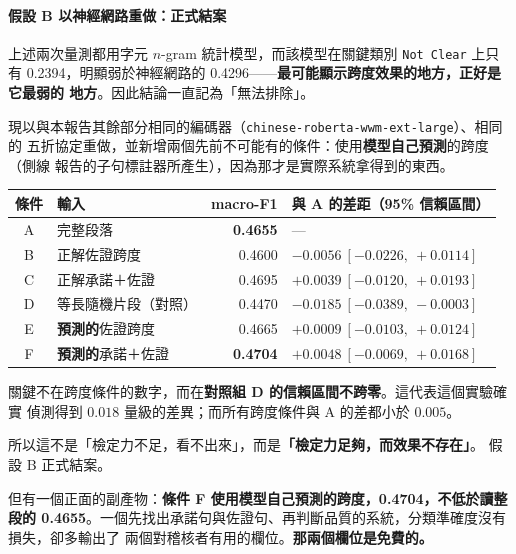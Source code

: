 \documentclass[11pt,a4paper]{ctexart}
\newcommand{\fn}[1]{\texttt{#1}}
\begin{document}
\paragraph{假設 B 以神經網路重做：正式結案}
\label{sec:bclosed}

上述兩次量測都用字元 $n$-gram 統計模型，而該模型在關鍵類別 \fn{Not Clear} 上只有
0.2394，明顯弱於神經網路的 0.4296——\textbf{最可能顯示跨度效果的地方，正好是它最弱的
地方}。因此結論一直記為「無法排除」。

現以與本報告其餘部分相同的編碼器（\texttt{chinese-roberta-wwm-ext-large}）、相同的
五折協定重做，並新增兩個先前不可能有的條件：使用\textbf{模型自己預測}的跨度（側線
報告的子句標註器所產生），因為那才是實際系統拿得到的東西。

\begin{table}[h]
\centering\small
\begin{tabular}{@{}clrl@{}}
\toprule
條件 & 輸入 & macro-F1 & 與 A 的差距（95\% 信賴區間） \\
\midrule
A & 完整段落 & \textbf{0.4655} & --- \\
B & 正解佐證跨度 & 0.4600 & $-0.0056\ [-0.0226,\ +0.0114]$ \\
C & 正解承諾＋佐證 & 0.4695 & $+0.0039\ [-0.0120,\ +0.0193]$ \\
\rowcolor{yellow!15}
D & 等長隨機片段（對照） & 0.4470 & $\mathbf{-0.0185\ [-0.0389,\ -0.0003]}$ \\
E & \textbf{預測的}佐證跨度 & 0.4665 & $+0.0009\ [-0.0103,\ +0.0124]$ \\
\rowcolor{green!12}
F & \textbf{預測的}承諾＋佐證 & \textbf{0.4704} & $+0.0048\ [-0.0069,\ +0.0168]$ \\
\bottomrule
\end{tabular}
\end{table}

\begin{tcolorbox}[colback=green!5, colframe=green!45, title=結論從「無法排除」變成「確定不成立」]
關鍵不在跨度條件的數字，而在\textbf{對照組 D 的信賴區間不跨零}。這代表這個實驗確實
偵測得到 $0.018$ 量級的差異；而所有跨度條件與 A 的差都小於 $0.005$。

\medskip
所以這不是「檢定力不足，看不出來」，而是\textbf{「檢定力足夠，而效果不存在」}。
假設 B 正式結案。

\medskip
但有一個正面的副產物：\textbf{條件 F 使用模型自己預測的跨度，0.4704，不低於讀整段的
0.4655}。一個先找出承諾句與佐證句、再判斷品質的系統，分類準確度沒有損失，卻多輸出了
兩個對稽核者有用的欄位。\textbf{那兩個欄位是免費的。}
\end{tcolorbox}
\end{document}
